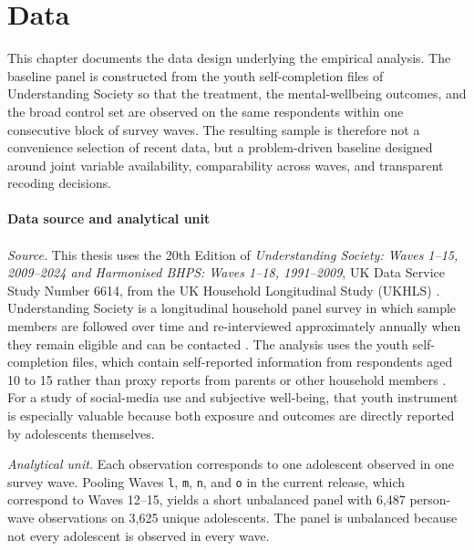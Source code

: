 \documentclass[11pt,oneside,a4paper]{book}
\newcommand{\bodychapter}[1]{%
  \chapter{#1}%
}
\begin{document}
\bodychapter{Data}
\label{chap:data}

This chapter documents the data design underlying the empirical analysis. The baseline panel is constructed from the youth self-completion files of Understanding Society so that the treatment, the mental-wellbeing outcomes, and the broad control set are observed on the same respondents within one consecutive block of survey waves. The resulting sample is therefore not a convenience selection of recent data, but a problem-driven baseline designed around joint variable availability, comparability across waves, and transparent recoding decisions.\\
\\
\textbf{Data source and analytical unit}
\\
\\
\textit{Source.} This thesis uses the 20th Edition of \textit{Understanding Society: Waves 1--15, 2009--2024 and Harmonised BHPS: Waves 1--18, 1991--2009}, UK Data Service Study Number 6614, from the UK Household Longitudinal Study (UKHLS) \citep{iser2025understandingsociety}. Understanding Society is a longitudinal household panel survey in which sample members are followed over time and re-interviewed approximately annually when they remain eligible and can be contacted \citep{iser2025userguide}. The analysis uses the youth self-completion files, which contain self-reported information from respondents aged 10 to 15 rather than proxy reports from parents or other household members \citep{iser2025userguide}. For a study of social-media use and subjective well-being, that youth instrument is especially valuable because both exposure and outcomes are directly reported by adolescents themselves.

\textit{Analytical unit.} Each observation corresponds to one adolescent observed in one survey wave. Pooling Waves \texttt{l}, \texttt{m}, \texttt{n}, and \texttt{o} in the current release, which correspond to Waves 12--15, yields a short unbalanced panel with 6,487 person-wave observations on 3,625 unique adolescents. The panel is unbalanced because not every adolescent is observed in every wave.
\end{document}
